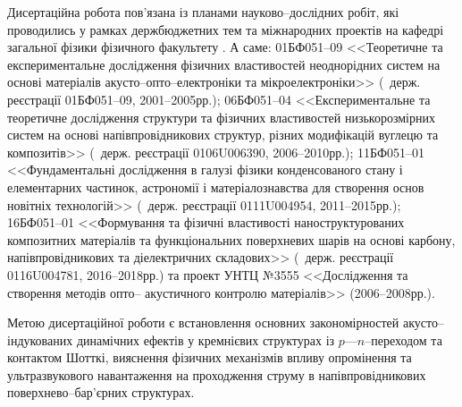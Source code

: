 {\InterconnectionTXT}
Дисертаційна робота  пов’язана із планами науково--дослідних робіт, які проводились у рамках
держбюджетних тем та міжнародних проектів на кафедрі загальної фізики фізичного факультету \thesisOfOrganization.
А саме:
\textnumero01БФ051--09 <<Теоретичне та експериментальне дослідження фізичних властивостей неоднорідних систем на основі матеріалів акусто--опто--електроніки та мікроелектроніки>>
(\textnumero~держ. реєстрації 01БФ051--09, 2001--2005рр.);
\textnumero06БФ051--04 <<Експериментальне та теоретичне дослідження структури та фізичних властивостей низькорозмірних систем на основі напівпровідникових структур, різних модифікацій вуглецю та композитів>>
(\textnumero~держ. реєстрації 0106U006390, 2006--2010рр.);
\textnumero11БФ051--01 <<Фундаментальні дослідження в галузі фізики конденсованого стану і елементарних частинок, астрономії і матеріалознавства для створення основ новітніх технологій>>
(\textnumero~держ. реєстрації 0111U004954, 2011--2015рр.);
\textnumero16БФ051--01 <<Формування та фізичні властивості наноструктурованих композитних матеріалів та функціональних поверхневих шарів на основі карбону, напівпровідникових та діелектричних складових>>
(\textnumero~держ. реєстрації  0116U004781, 2016--2018рр.) та
проект УНТЦ №3555 <<Дослідження та створення методів опто-- акустичного контролю матеріалів>> (2006--2008рр.).

{\AimAndTasksTXT}
Метою дисертаційної роботи є
встановлення основних закономірностей акусто--індукованих динамічних ефектів у кремнієвих структурах із $p$---$n$--переходом та контактом Шотткі,
вияснення фізичних механізмів впливу опромінення та ультразвукового навантаження на проходження струму в напівпровідникових поверхнево--бар'єрних структурах.

